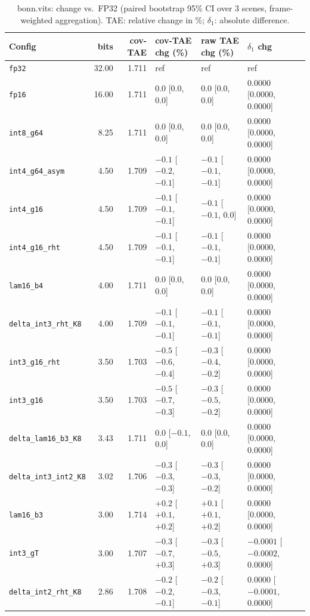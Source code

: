 \begin{table}[t]
\centering
\small
\caption{bonn.vits: change vs.\ FP32 (paired bootstrap 95\% CI over 3 scenes, frame-weighted aggregation). TAE: relative change in \%; $\delta_1$: absolute difference.}
\label{tab:boot_bonn_vits_fw}
\begin{tabular}{lrrlll}
\toprule
Config & bits & cov-TAE & cov-TAE chg (\%) & raw TAE chg (\%) & $\delta_1$ chg \\
\midrule
\texttt{fp32} & 32.00 & 1.711 & ref & ref & ref \\
\texttt{fp16} & 16.00 & 1.711 & 0.0 [0.0, 0.0] & 0.0 [0.0, 0.0] & 0.0000 [0.0000, 0.0000] \\
\texttt{int8\_g64} & 8.25 & 1.711 & 0.0 [0.0, 0.0] & 0.0 [0.0, 0.0] & 0.0000 [0.0000, 0.0000] \\
\texttt{int4\_g64\_asym} & 4.50 & 1.709 & $-0.1$ [$-0.2$, $-0.1$] & $-0.1$ [$-0.1$, $-0.1$] & 0.0000 [0.0000, 0.0000] \\
\texttt{int4\_g16} & 4.50 & 1.709 & $-0.1$ [$-0.1$, $-0.1$] & $-0.1$ [$-0.1$, 0.0] & 0.0000 [0.0000, 0.0000] \\
\texttt{int4\_g16\_rht} & 4.50 & 1.709 & $-0.1$ [$-0.1$, $-0.1$] & $-0.1$ [$-0.1$, $-0.1$] & 0.0000 [0.0000, 0.0000] \\
\texttt{lam16\_b4} & 4.00 & 1.711 & 0.0 [0.0, 0.0] & 0.0 [0.0, 0.0] & 0.0000 [0.0000, 0.0000] \\
\texttt{delta\_int3\_rht\_K8} & 4.00 & 1.709 & $-0.1$ [$-0.1$, $-0.1$] & $-0.1$ [$-0.1$, $-0.1$] & 0.0000 [0.0000, 0.0000] \\
\texttt{int3\_g16\_rht} & 3.50 & 1.703 & $-0.5$ [$-0.6$, $-0.4$] & $-0.3$ [$-0.4$, $-0.2$] & 0.0000 [0.0000, 0.0000] \\
\texttt{int3\_g16} & 3.50 & 1.703 & $-0.5$ [$-0.7$, $-0.3$] & $-0.3$ [$-0.5$, $-0.2$] & 0.0000 [0.0000, 0.0000] \\
\texttt{delta\_lam16\_b3\_K8} & 3.43 & 1.711 & 0.0 [$-0.1$, 0.0] & 0.0 [0.0, 0.0] & 0.0000 [0.0000, 0.0000] \\
\texttt{delta\_int3\_int2\_K8} & 3.02 & 1.706 & $-0.3$ [$-0.3$, $-0.3$] & $-0.3$ [$-0.3$, $-0.2$] & 0.0000 [0.0000, 0.0000] \\
\texttt{lam16\_b3} & 3.00 & 1.714 & $+0.2$ [$+0.1$, $+0.2$] & $+0.1$ [$+0.1$, $+0.2$] & 0.0000 [0.0000, 0.0000] \\
\texttt{int3\_gT} & 3.00 & 1.707 & $-0.3$ [$-0.7$, $+0.3$] & $-0.3$ [$-0.5$, $+0.3$] & $-0.0001$ [$-0.0002$, 0.0000] \\
\texttt{delta\_int2\_rht\_K8} & 2.86 & 1.708 & $-0.2$ [$-0.2$, $-0.1$] & $-0.2$ [$-0.3$, $-0.1$] & 0.0000 [$-0.0001$, 0.0000] \\

\end{tabular}
\end{table}
